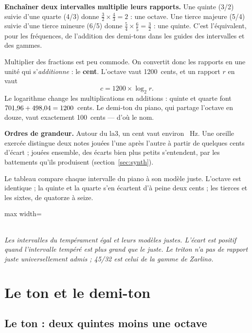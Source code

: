 \documentclass[a4paper,11pt]{article}
\newcommand{\legende}[1]{\\[4pt]{\small\itshape\color{mygray} #1}}
\begin{document}
\textbf{Enchaîner deux intervalles multiplie leurs rapports.} Une quinte
(3/2) suivie d'une quarte (4/3) donne $\tfrac32 \times \tfrac43 = 2$ : une
octave. Une tierce majeure (5/4) suivie d'une tierce mineure (6/5) donne
$\tfrac54 \times \tfrac65 = \tfrac32$ : une quinte. C'est l'équivalent, pour
les fréquences, de l'addition des demi-tons dans les guides des intervalles
et des gammes.

Multiplier des fractions est peu commode. On convertit donc les rapports en
une unité qui s'\emph{additionne} : le \textbf{cent}. L'octave vaut
1200~cents, et un rapport $r$ en vaut
\[
  c = 1200 \times \log_2 r .
\]
Le logarithme change les multiplications en additions : quinte et quarte
font $701{,}96 + 498{,}04 = 1200$~cents. Le demi-ton du piano, qui
partage l'octave en douze, vaut exactement 100~cents --- d'où le nom.

\begin{remarque}
\textbf{Ordres de grandeur.} Autour du la3, un cent vaut environ \centHz~Hz.
Une oreille exercée distingue deux notes jouées l'une après l'autre à partir
de quelques cents d'écart ; jouées ensemble, des écarts bien plus petits
s'entendent, par les battements qu'ils produisent
(section~\ref{sec:synth}).
\end{remarque}

Le tableau compare chaque intervalle du piano à son modèle juste. L'octave est
identique ; la quinte et la quarte s'en écartent d'à peine deux cents ; les
tierces et les sixtes, de quatorze à seize.

\begin{center}
\small
\begin{adjustbox}{max width=\linewidth}

\end{adjustbox}
\legende{Les intervalles du tempérament égal et leurs modèles justes. L'écart
est positif quand l'intervalle tempéré est plus grand que le juste. Le triton
n'a pas de rapport juste universellement admis ; 45/32 est celui de la gamme
de Zarlino.}
\end{center}

\section{Le ton et le demi-ton}
\label{sec:ton}

\subsection{Le ton : deux quintes moins une octave}
\end{document}

